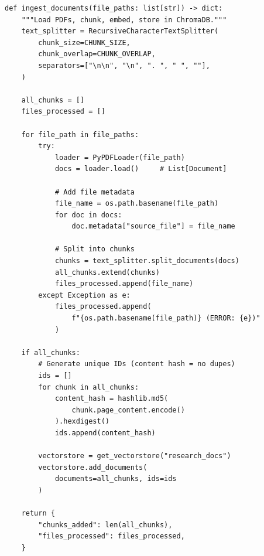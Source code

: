 \documentclass[12pt, a4paper]{article}
\begin{document}
\begin{lstlisting}[style=pythonstyle, title={\color{accentgreen}\faIcon{file} PDF Ingestion Function}]
def ingest_documents(file_paths: list[str]) -> dict:
    """Load PDFs, chunk, embed, store in ChromaDB."""
    text_splitter = RecursiveCharacterTextSplitter(
        chunk_size=CHUNK_SIZE,
        chunk_overlap=CHUNK_OVERLAP,
        separators=["\n\n", "\n", ". ", " ", ""],
    )

    all_chunks = []
    files_processed = []

    for file_path in file_paths:
        try:
            loader = PyPDFLoader(file_path)
            docs = loader.load()     # List[Document]

            # Add file metadata
            file_name = os.path.basename(file_path)
            for doc in docs:
                doc.metadata["source_file"] = file_name

            # Split into chunks
            chunks = text_splitter.split_documents(docs)
            all_chunks.extend(chunks)
            files_processed.append(file_name)
        except Exception as e:
            files_processed.append(
                f"{os.path.basename(file_path)} (ERROR: {e})"
            )

    if all_chunks:
        # Generate unique IDs (content hash = no dupes)
        ids = []
        for chunk in all_chunks:
            content_hash = hashlib.md5(
                chunk.page_content.encode()
            ).hexdigest()
            ids.append(content_hash)

        vectorstore = get_vectorstore("research_docs")
        vectorstore.add_documents(
            documents=all_chunks, ids=ids
        )

    return {
        "chunks_added": len(all_chunks),
        "files_processed": files_processed,
    }
\end{lstlisting}
\end{document}
